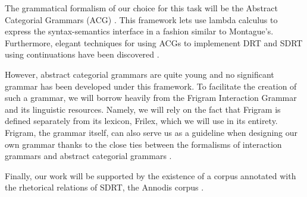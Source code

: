 The grammatical formalism of our choice for this task will be the
Abstract Categorial Grammars (ACG) \cite{de2001towards}. This framework
lets use lambda calculus to express the syntax-semantics interface in a
fashion similar to Montague's. Furthermore, elegant techniques for using
ACGs to implemenent DRT and SDRT using continuations have been
discovered \cite{de2006towards} \cite{asher2011sdrt}
\cite{asher2011montagovian}.

However, abstract categorial grammars are quite young and no significant
grammar has been developed under this framework. To facilitate the
creation of such a grammar, we will borrow heavily from the Frigram
Interaction Grammar \cite{perrier2007french} and its linguistic
resources. Namely, we will rely on the fact that Frigram is defined
separately from its lexicon, Frilex, which we will use in its
entirety. Frigram, the grammar itself, can also serve us as a guideline
when designing our own grammar thanks to the close ties between the
formalisms of interaction grammars and abstract categorial grammars
\cite{perrier1999intuitionistic}.

Finally, our work will be supported by the existence of a corpus
annotated with the rhetorical relations of SDRT, the Annodis corpus
\cite{afantenos2012empirical}.
